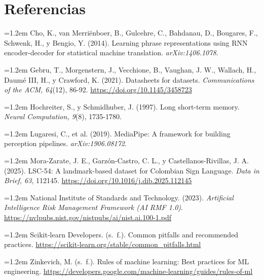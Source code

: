 \documentclass[11pt,a4paper]{article}
\begin{document}
\section*{Referencias}
\sloppy\footnotesize
\setlength{\parskip}{2pt}
\noindent\hangindent=1.2em Cho, K., van Merriënboer, B., Gulcehre, C., Bahdanau, D., Bougares, F., Schwenk, H., y Bengio, Y. (2014). Learning phrase representations using RNN encoder-decoder for statistical machine translation. \emph{arXiv:1406.1078}.\par
\noindent\hangindent=1.2em Gebru, T., Morgenstern, J., Vecchione, B., Vaughan, J. W., Wallach, H., Daumé III, H., y Crawford, K. (2021). Datasheets for datasets. \emph{Communications of the ACM, 64}(12), 86-92. \url{https://doi.org/10.1145/3458723}\par
\noindent\hangindent=1.2em Hochreiter, S., y Schmidhuber, J. (1997). Long short-term memory. \emph{Neural Computation, 9}(8), 1735-1780.\par
\noindent\hangindent=1.2em Lugaresi, C., et al. (2019). MediaPipe: A framework for building perception pipelines. \emph{arXiv:1906.08172}.\par
\noindent\hangindent=1.2em Mora-Zarate, J. E., Garzón-Castro, C. L., y Castellanos-Rivillas, J. A. (2025). LSC-54: A landmark-based dataset for Colombian Sign Language. \emph{Data in Brief, 63}, 112145. \url{https://doi.org/10.1016/j.dib.2025.112145}\par
\noindent\hangindent=1.2em National Institute of Standards and Technology. (2023). \emph{Artificial Intelligence Risk Management Framework (AI RMF 1.0)}. \url{https://nvlpubs.nist.gov/nistpubs/ai/nist.ai.100-1.pdf}\par
\noindent\hangindent=1.2em Scikit-learn Developers. (s.~f.). Common pitfalls and recommended practices. \url{https://scikit-learn.org/stable/common_pitfalls.html}\par
\noindent\hangindent=1.2em Zinkevich, M. (s.~f.). Rules of machine learning: Best practices for ML engineering. \url{https://developers.google.com/machine-learning/guides/rules-of-ml}\par
\end{document}
